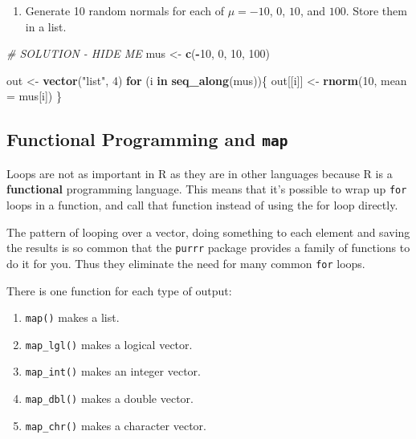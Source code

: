 \documentclass[]{book}
\newenvironment{Shaded}{\begin{snugshade}}{\end{snugshade}}
\newcommand{\KeywordTok}[1]{\textcolor[rgb]{0.13,0.29,0.53}{\textbf{#1}}}
\newcommand{\DataTypeTok}[1]{\textcolor[rgb]{0.13,0.29,0.53}{#1}}
\newcommand{\DecValTok}[1]{\textcolor[rgb]{0.00,0.00,0.81}{#1}}
\newcommand{\StringTok}[1]{\textcolor[rgb]{0.31,0.60,0.02}{#1}}
\newcommand{\CommentTok}[1]{\textcolor[rgb]{0.56,0.35,0.01}{\textit{#1}}}
\newcommand{\ControlFlowTok}[1]{\textcolor[rgb]{0.13,0.29,0.53}{\textbf{#1}}}
\newcommand{\OperatorTok}[1]{\textcolor[rgb]{0.81,0.36,0.00}{\textbf{#1}}}
\newcommand{\NormalTok}[1]{#1}
\providecommand{\tightlist}{%
  \setlength{\itemsep}{0pt}\setlength{\parskip}{0pt}}
\begin{document}
\begin{enumerate}
\def\labelenumi{\arabic{enumi}.}
\setcounter{enumi}{2}
\tightlist
\item
  Generate 10 random normals for each of \(\mu = -10\), \(0\), \(10\),
  and \(100\). Store them in a list.
\end{enumerate}

\begin{Shaded}
\begin{Highlighting}[]
\CommentTok{# SOLUTION - HIDE ME}
\NormalTok{mus <-}\StringTok{ }\KeywordTok{c}\NormalTok{(}\OperatorTok{-}\DecValTok{10}\NormalTok{, }\DecValTok{0}\NormalTok{, }\DecValTok{10}\NormalTok{, }\DecValTok{100}\NormalTok{)}

\NormalTok{out <-}\StringTok{ }\KeywordTok{vector}\NormalTok{(}\StringTok{"list"}\NormalTok{, }\DecValTok{4}\NormalTok{)}
\ControlFlowTok{for}\NormalTok{ (i }\ControlFlowTok{in} \KeywordTok{seq_along}\NormalTok{(mus))\{}
\NormalTok{  out[[i]] <-}\StringTok{ }\KeywordTok{rnorm}\NormalTok{(}\DecValTok{10}\NormalTok{, }\DataTypeTok{mean =}\NormalTok{ mus[i])}
\NormalTok{\}}
\end{Highlighting}
\end{Shaded}

\subsection{\texorpdfstring{Functional Programming and
\texttt{map}}{Functional Programming and map}}\label{functional-programming-and-map}

Loops are not as important in R as they are in other languages because R
is a \textbf{functional} programming language. This means that it's
possible to wrap up \texttt{for} loops in a function, and call that
function instead of using the for loop directly.

The pattern of looping over a vector, doing something to each element
and saving the results is so common that the \texttt{purrr} package
provides a family of functions to do it for you. Thus they eliminate the
need for many common \texttt{for} loops.

There is one function for each type of output:

\begin{enumerate}
\def\labelenumi{\arabic{enumi}.}
\tightlist
\item
  \texttt{map()} makes a list.
\item
  \texttt{map\_lgl()} makes a logical vector.
\item
  \texttt{map\_int()} makes an integer vector.
\item
  \texttt{map\_dbl()} makes a double vector.
\item
  \texttt{map\_chr()} makes a character vector.
\end{enumerate}
\end{document}
